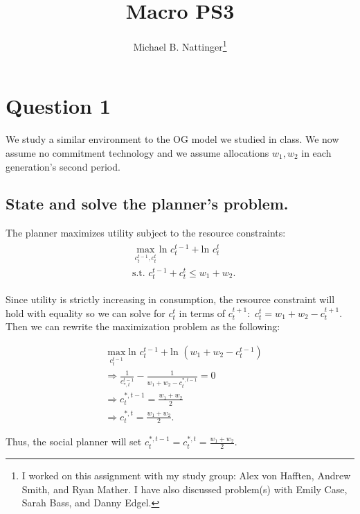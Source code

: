 \documentclass[11pt]{article} %
\title{Macro PS3}
\author{Michael B. Nattinger\footnote{I worked on this assignment with my study group: Alex von Hafften, Andrew Smith, and Ryan Mather. I have also discussed problem(s) with Emily Case, Sarah Bass, and Danny Edgel.}}
\begin{document}
\maketitle

\section{Question 1}
We study a similar environment to the OG model we studied in class. We now assume no commitment technology and we assume allocations $w_1,w_2$ in each generation's second period. 
\subsection{State and solve the planner's problem.}
The planner maximizes utility subject to the resource constraints:
\begin{align}
\begin{split}
&\max_{c_{t}^{t-1},c_{t}^{t}} \text{ln } c_{t}^{t-1} + \text{ln } c_{t}^{t}\\  \label{eqn:planner}
&\text{s.t. } c_{t}^{t-1} + c_{t}^{t} \leq w_1 + w_2.
\end{split}
\end{align}

Since utility is strictly increasing in consumption, the resource constraint will hold with equality so we can solve for $c_t^t$ in terms of $c_t^{t+1}:$ $c_t^t = w_1 + w_2 - c_t^{t+1}.$ Then we can rewrite the maximization problem as the following:

\begin{align*}
&\max_{c_{t}^{t-1}} \text{ln } c_{t}^{t-1} + \text{ln } (w_1 + w_2 - c_t^{t-1})\\
&\Rightarrow \frac{1}{c_{*,t}^{t-1}} - \frac{1}{w_1 + w_2 - c_t^{*,t-1}} = 0\\
&\Rightarrow c_t^{*,t-1} = \frac{w_1 + w_2}{2} \\
&\Rightarrow c_t^{*,t} = \frac{w_1 + w_2}{2}.
\end{align*}

Thus, the social planner will set $c_t^{*,t-1} = c_t^{*,t} = \frac{w_1 + w_2}{2}$.
\end{document}

